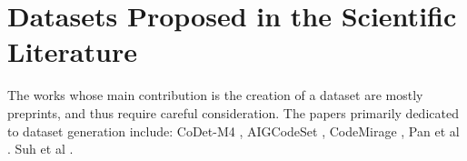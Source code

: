 \clearpage
\section{Datasets Proposed in the Scientific Literature}
The works whose main contribution is the 
creation of a dataset are mostly preprints, 
and thus require careful consideration. 
The papers primarily dedicated to dataset 
generation include: CoDet-M4 \cite{orel2025codet}, 
AIGCodeSet \cite{demirok2024aigcodeset}, 
CodeMirage \cite{guo2025codemirage},
Pan et al \cite{pan2024assessing}.
Suh et al \cite{suh2024empirical}.










